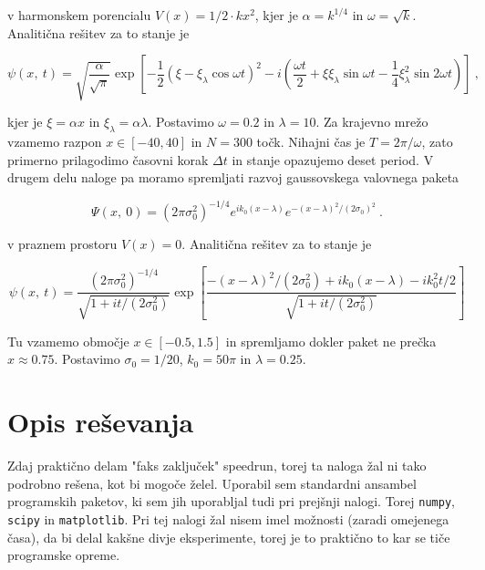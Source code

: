 \documentclass[a4paper]{article}
\begin{document}
v harmonskem porencialu $V(x) = 1/2\cdot k x^2$, kjer je $\alpha = k^{1/4}$ in $\omega = \sqrt{k}$.
Analitična rešitev za to stanje je

\begin{equation}
    \psi(x,\>t) = \sqrt{\frac{\alpha}{\sqrt{\pi}}} \exp{\left[-\frac{1}{2}(\xi - 
    \xi_\lambda \cos{\omega t})^2-
    i\left(\frac{\omega t}{2} + \xi\xi_\lambda \sin{\omega t} - 
    \frac{1}{4}\xi_\lambda^2\sin{2\omega t}\right)\right]}\>,
    \label{analiticna_resitev1}
\end{equation}

kjer je $\xi=\alpha x$ in $\xi_\lambda = \alpha\lambda$. Postavimo $\omega=0.2$ in $\lambda=10$.
Za krajevno mrežo vzamemo razpon $x\in[-40, 40]$ in $N=300$ točk. Nihajni čas je $T=2\pi/\omega$,
zato primerno prilagodimo časovni korak $\Delta t$ in stanje opazujemo deset period. V drugem delu naloge pa moramo spremljati razvoj gaussovskega valovnega paketa 

\begin{equation}
    \Psi(x,\>0) = (2\pi\sigma_0^2)^{-1/4} e^{ik_0(x-\lambda)}e^{-(x-\lambda)^2/(2\sigma_0)^2}\>.
    \label{zacetno_stanje2}
\end{equation}

v praznem prostoru $V(x) = 0$. Analitična rešitev za to stanje je

\begin{equation}
    \psi(x,\>t) = \frac{(2\pi\sigma_0^2)^{-1/4}}{\sqrt{1 + i t/(2\sigma_0^2)}}
    \exp{\left[\frac{-(x-\lambda)^2/(2\sigma_0^2) + ik_0(x-\lambda)-ik_0^2 t/2}
    {\sqrt{1 + i t/(2\sigma_0^2)}}\right]}
    \label{analiticna_resitev2}
\end{equation}

Tu vzamemo območje $x\in[-0.5, 1.5]$ in spremljamo dokler paket ne prečka $x\approx 0.75$.
Postavimo $\sigma_0=1/20$, $k_0=50\pi$ in $\lambda=0.25$.

\section{Opis reševanja}
Zdaj praktično delam "faks zaključek" speedrun, torej ta naloga žal ni tako podrobno rešena,
kot bi mogoče želel. Uporabil sem standardni ansambel programskih paketov, ki sem jih uporabljal
tudi pri prejšnji nalogi. Torej \texttt{numpy}, \texttt{scipy} in \texttt{matplotlib}. Pri tej nalogi
žal nisem imel možnosti (zaradi omejenega časa), da bi delal kakšne divje eksperimente, torej je to praktično to
kar se tiče programske opreme.\\
\end{document}
